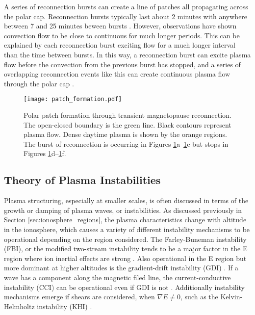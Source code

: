 A series of reconnection bursts can create a line of patches all propagating across the polar cap.  Reconnection bursts typically last about 2 minutes with anywhere between 7 and 25 minutes beween bursts \citep{Foster1984,Etemadi1988,Lockwood1992b}.  However, observations have shown convection flow to be close to continuous for much longer periods.  This can be explained by each reconnection burst exciting flow for a much longer interval than the time between bursts.  In this way, a reconnection burst can excite plasma flow before the convection from the previous burst has stopped, and a series of overlapping reconnection events like this can create continuous plasma flow through the polar cap \citep{Cowley1991}. 

\begin{figure}
	\texttt{[image: patch\_formation.pdf]}
	\caption{Polar patch formation through transient magnetopause reconnection.  The open-closed boundary is the green line.  Black contours represent plasma flow.  Dense daytime plasma is shown by the orange regions.  The burst of reconnection is occurring in Figures \ref{fig:patch_formation}a--\ref{fig:patch_formation}c but stops in Figures \ref{fig:patch_formation}d--\ref{fig:patch_formation}f.}
	\label{fig:patch_formation}
\end{figure}

\subsection{Theory of Plasma Instabilities}
\label{sec:lit_instabilities}
Plasma structuring, especially at smaller scales, is often discussed in terms of the growth or damping of plasma waves, or instabilities.  As discussed previously in Section \ref{sec:ionosphere_regions}, the plasma characteristics change with altitude in the ionosphere, which causes a variety of different instability mechanisms to be operational depending on the region considered.  The Farley-Buneman instability (FBI), or the modified two-stream instability tends to be a major factor in the E region where ion inertial effects are strong \citep{Farley1963,Buneman1963}.  Also operational in the E region but more dominant at higher altitudes is the gradient-drift instability (GDI) \citep{Simon1963,Hoh1963,Linson1970}.  If a wave has a component along the magnetic filed line, the current-conductive instability (CCI) can be operational even if GDI is not \citep{Hoh1960,Ossakow1979,Chaturvedi1981}.  Additionally instability mechanisms emerge if shears are considered, when \(\nabla E \neq 0\), such as the Kelvin-Helmholtz instability (KHI) \citep{Kintner1977,DAngelo1965}.

